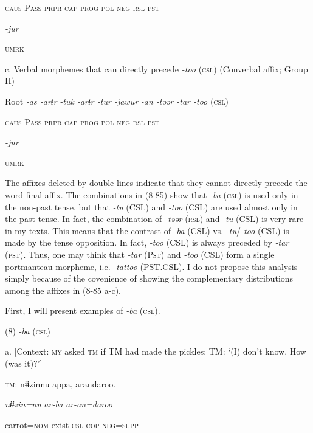     \textsc{caus}  P\textsc{ass}  \textsc{prpr}  \textsc{cap}  \textsc{prog}  \textsc{pol}  \textsc{neg}  \textsc{rsl}  \textsc{pst}

          \textit{{}-jur} 

          \textsc{umrk}

  c. Verbal morphemes that can directly precede \textit{{}-too} (\textsc{csl}) (Converbal affix; Group II)

  Root  \textit{{}-as  {}-arɨr} %
\textit{{}-tuk  {}-arɨr  {}-tur  {}-jawur} %
\textit{{}-an  {}-təər  {}-tar  {}-too} (\textsc{csl})

    \textsc{caus}  P\textsc{ass}  \textsc{prpr}  \textsc{cap}  \textsc{prog}  \textsc{pol}  \textsc{neg}  \textsc{rsl}  \textsc{pst}

          \textit{{}-jur} 

          \textsc{umrk}

The affixes deleted by double lines indicate that they cannot directly precede the word-final affix. The combinations in (8-85) show that \textit{{}-ba} (\textsc{csl}) is used only in the non-past tense, but that \textit{{}-tu} (CSL) and \textit{{}-too} (CSL) are used almost only in the past tense. In fact, the combination of \textit{{}-təər} (\textsc{rsl}) and \textit{{}-tu} (CSL) is very rare in my texts. This means that the contrast of \textit{{}-ba} (CSL) vs. \textit{{}-tu}/\textit{{}-too} (CSL) is made by the tense opposition. In fact, \textit{-too} (CSL) is always preceded by \textit{{}-tar} (\textsc{pst}). Thus, one may think that \textit{{}-tar} (P\textsc{st}) and \textit{{}-too} (CSL) form a single portmanteau morpheme, i.e. \textit{{}-tattoo} (PST.CSL). I do not propose this analysis simply because of the covenience of showing the complementary distributions among the affixes in (8-85 a-c).

  First, I will present examples of \textit{{}-ba} (\textsc{csl}).

(8)  \textit{{}-ba} (\textsc{csl})

  a.  [Context: \textsc{my} asked \textsc{tm} if TM had made the pickles; TM: ‘(I) don’t know. How (was it)?’]

    \textsc{tm}:  nɨɨzinnu  appa,  arandaroo.

      \textit{nɨɨzin=nu}  \textit{ar-ba}  \textit{ar-an=daroo}

      carrot=\textsc{nom}  exist-\textsc{csl}  \textsc{cop}-\textsc{neg}=\textsc{supp}

